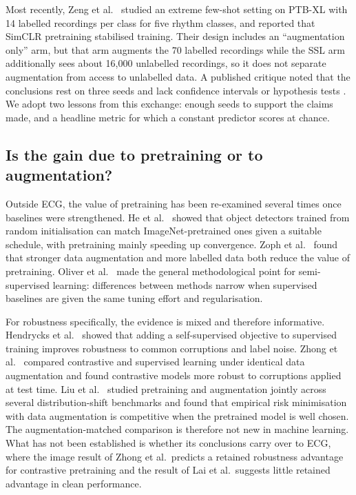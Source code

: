 \documentclass[preprint,12pt]{elsarticle}
\begin{document}
Most recently, Zeng et al.\ \cite{zeng2026} studied an extreme few-shot setting on PTB-XL with 14 labelled recordings per class for five rhythm classes, and reported that SimCLR pretraining stabilised training. Their design includes an ``augmentation only'' arm, but that arm augments the 70 labelled recordings while the SSL arm additionally sees about 16,000 unlabelled recordings, so it does not separate augmentation from access to unlabelled data. A published critique noted that the conclusions rest on three seeds and lack confidence intervals or hypothesis tests \cite{ahmed2026}. We adopt two lessons from this exchange: enough seeds to support the claims made, and a headline metric for which a constant predictor scores at chance.

\subsection{Is the gain due to pretraining or to augmentation?}

Outside ECG, the value of pretraining has been re-examined several times once baselines were strengthened. He et al.\ \cite{he2019rethinking} showed that object detectors trained from random initialisation can match ImageNet-pretrained ones given a suitable schedule, with pretraining mainly speeding up convergence. Zoph et al.\ \cite{zoph2020} found that stronger data augmentation and more labelled data both reduce the value of pretraining. Oliver et al.\ \cite{oliver2018} made the general methodological point for semi-supervised learning: differences between methods narrow when supervised baselines are given the same tuning effort and regularisation.

For robustness specifically, the evidence is mixed and therefore informative. Hendrycks et al.\ \cite{hendrycks2019ssl} showed that adding a self-supervised objective to supervised training improves robustness to common corruptions and label noise. Zhong et al.\ \cite{zhong2022} compared contrastive and supervised learning under identical data augmentation and found contrastive models more robust to corruptions applied at test time. Liu et al.\ \cite{liu2022shift} studied pretraining and augmentation jointly across several distribution-shift benchmarks and found that empirical risk minimisation with data augmentation is competitive when the pretrained model is well chosen. The augmentation-matched comparison is therefore not new in machine learning. What has not been established is whether its conclusions carry over to ECG, where the image result of Zhong et al.\ predicts a retained robustness advantage for contrastive pretraining and the result of Lai et al.\ suggests little retained advantage in clean performance.
\end{document}
